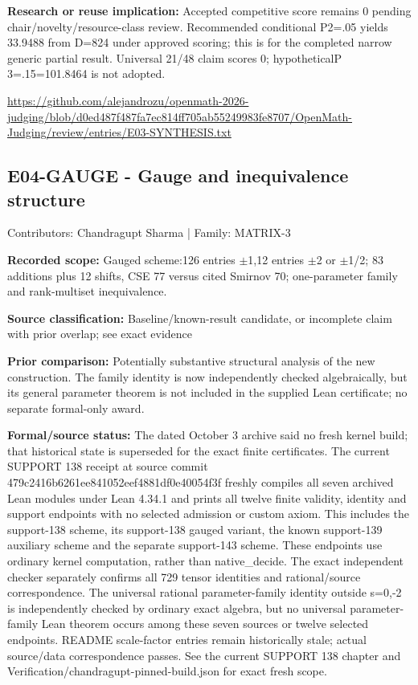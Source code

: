 \documentclass[11pt,a4paper]{article}
\begin{document}
\textbf{Research or reuse implication:} Accepted competitive score remains 0 pending chair/novelty/resource-class review. Recommended conditional P2=.05 yields 33.9488 from D=824 under approved scoring; this is for the completed narrow generic partial result. Universal 21/48 claim scores 0; hypotheticalP 3=.15=101.8464 is not adopted.

{\small \url{https://github.com/alejandrozu/openmath-2026-judging/blob/d0ed487f487fa7ec814ff705ab55249983fe8707/OpenMath-Judging/review/entries/E03-SYNTHESIS.txt}\par}

\begin{samepage}
\subsection{E04-GAUGE  -  Gauge and inequivalence structure}
{\small Contributors: Chandragupt Sharma | Family: MATRIX-3\par}

\textbf{Recorded scope:} Gauged scheme:126 entries \ensuremath{\pm}1,12 entries \ensuremath{\pm}2 or \ensuremath{\pm}1/2; 83 additions plus 12 shifts, CSE 77 versus cited Smirnov 70; one-parameter family and rank-multiset inequivalence.

\end{samepage}
\textbf{Source classification:} Baseline/known-result candidate, or incomplete claim with prior overlap; see exact evidence

\textbf{Prior comparison:} Potentially substantive structural analysis of the new construction. The family identity is now independently checked algebraically, but its general parameter theorem is not included in the supplied Lean certificate; no separate formal-only award.

\textbf{Formal/source status:} The dated October 3 archive said no fresh kernel build; that historical state is superseded for the exact finite certificates. The current SUPPORT 138 receipt at source commit 479c2416b6261ee841052eef4881df0e40054f3f freshly compiles all seven archived Lean modules under Lean 4.34.1 and prints all twelve finite validity, identity and support endpoints with no selected admission or custom axiom. This includes the support-138 scheme, its support-138 gauged variant, the known support-139 auxiliary scheme and the separate support-143 scheme. These endpoints use ordinary kernel computation, rather than native\_decide. The exact independent checker separately confirms all 729 tensor identities and rational/source correspondence. The universal rational parameter-family identity outside s=0,-2 is independently checked by ordinary exact algebra, but no universal parameter-family Lean theorem occurs among these seven sources or twelve selected endpoints. README scale-factor entries remain historically stale; actual source/data correspondence passes. See the current SUPPORT 138 chapter and Verification/chandragupt-pinned-build.json for exact fresh scope.
\end{document}
